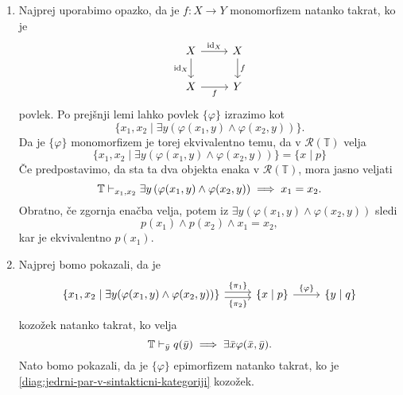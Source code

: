 \documentclass[../kategoricna_logika.tex]{subfiles}
\begin{document}
  \begin{dokaz}
    \begin{enumerate}[label=(\roman*)]
    \item Najprej uporabimo opazko, da je $f : X \to Y$
      monomorfizem natanko takrat, ko je
      \begin{equation*}
        \begin{tikzcd}
          X \ar[d, " \mathrm{id}_X"'] \ar[r, " \mathrm{id}_X"] & X \ar[d, "f"] \\
          X \ar[r, "f"'] & Y
        \end{tikzcd}
      \end{equation*}
      povlek. Po prejšnji lemi lahko povlek $\{\varphi\}$ izrazimo kot
      \[ \{ x_1,x_2 \mid \exists y(\varphi(x_1,y) \land
        \varphi(x_2,y)) \}.\] Da je $\{\varphi\}$ monomorfizem je
      torej ekvivalentno temu, da v $\mathcal{R}(\mathbb{T})$ velja
      \[ \{ x_1,x_2 \mid \exists y(\varphi(x_1,y) \land
        \varphi(x_2,y)) \} = \{x \mid p\} \] Če predpostavimo, da sta
      ta dva objekta enaka v $\mathcal{R}(\mathbb{T})$, mora jasno
      veljati
    $$\mathbb{T} \vdash_{x_1,x_2}  \exists y \left( \varphi(x_1,y) \wedge \varphi(x_2,y) \right) \implies x_1 = x_2 .$$
    Obratno, če zgornja enačba velja, potem iz
    $\exists y(\varphi(x_1,y) \land \varphi(x_2,y))$ sledi
    \[p(x_1) \land p(x_2) \land x_1 = x_2,\] kar je ekvivalentno
    $p(x_1)$.

  \item Najprej bomo pokazali, da je
    \begin{equation}\label{diag:jedrni-par-v-sintakticni-kategoriji}
      \begin{tikzcd}[column sep=normal]
        \{ x_1,x_2 \mid \exists y(\varphi(x_1,y) \land \varphi(x_2,y))
        \} \ar[r, shift left, "\{\pi_1\}"] \ar[r, shift right,
        "\{\pi_2\}"'] & \{x \mid p\} \ar[r, "\{\varphi\}"] & \{y \mid
        q\}
      \end{tikzcd}
    \end{equation}
    kozožek natanko takrat, ko velja
    $$\mathbb{T} \vdash_{\bar{y}} q(\bar{y}) \implies \exists \bar{x} \varphi(\bar{x},\bar{y}).$$
    Nato bomo pokazali, da je $\{ \varphi\}$ epimorfizem natanko
    takrat, ko je \eqref{diag:jedrni-par-v-sintakticni-kategoriji}
    kozožek.



\end{enumerate}
\end{dokaz}
\end{document}
